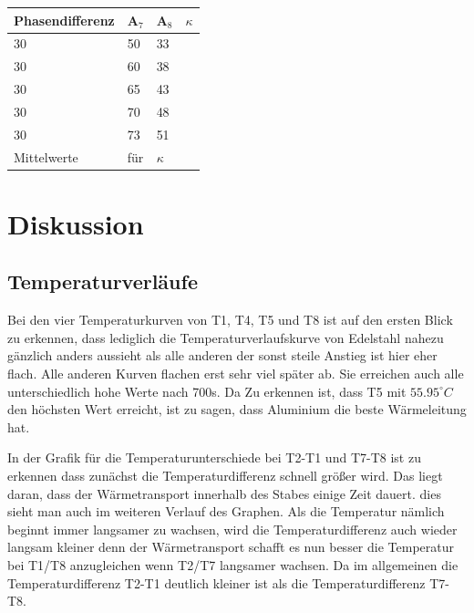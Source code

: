 \begin{minipage}{\linewidth}
    \begin{table}[H]
        \centering
    \begin{tabular}{llll}
        \toprule
        Phasendifferenz & A$_7$ & A$_8$ & $\kappa$  \\
        \midrule
        30 & 50 & 33 &  \\
        30 & 60 & 38 &  \\
        30 & 65 & 43 &  \\
        30 & 70 & 48 &  \\
        30 & 73 & 51 &  \\
        \midrule
        Mittelwerte&für&$\kappa$&\\
        \bottomrule   
    \end{tabular}
\end{table}
\end{minipage}

\section{Diskussion}

\subsection{Temperaturverläufe}

Bei den vier Temperaturkurven von T1, T4, T5 und T8 ist auf den ersten Blick zu erkennen, dass lediglich die Temperaturverlaufskurve von Edelstahl nahezu gänzlich anders aussieht als alle anderen der sonst steile Anstieg ist hier eher flach. Alle anderen Kurven flachen erst sehr viel später ab. Sie erreichen auch alle unterschiedlich hohe Werte nach 700s. Da Zu erkennen ist, dass T5 mit $55.95 ^\circ C$ den höchsten Wert erreicht, ist zu sagen, dass Aluminium die beste Wärmeleitung hat. 

In der Grafik für die Temperaturunterschiede bei T2-T1 und T7-T8 ist zu erkennen dass zunächst die Temperaturdifferenz schnell größer wird. Das liegt daran, dass der Wärmetransport innerhalb des Stabes einige Zeit dauert. dies sieht man auch im weiteren Verlauf des Graphen. Als die Temperatur nämlich beginnt immer langsamer zu wachsen, wird die Temperaturdifferenz auch wieder langsam kleiner denn der Wärmetransport schafft es nun besser die Temperatur bei T1/T8 anzugleichen wenn T2/T7 langsamer wachsen. Da im allgemeinen die Temperaturdifferenz T2-T1 deutlich kleiner ist als die Temperaturdifferenz T7-T8.

